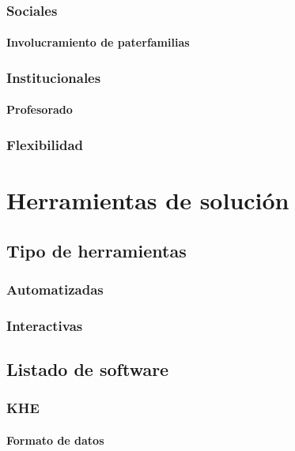 \documentclass[draft,12pt,headsepline,footsepline,paper=letter]{scrreprt}
\begin{document}
\subsection{Sociales}

\subsubsection{Involucramiento de paterfamilias}

\subsection{Institucionales}

\subsubsection{Profesorado}

\subsection{Flexibilidad}

\chapter{Herramientas de solución}

\section{Tipo de herramientas}

\subsection{Automatizadas}

\subsection{Interactivas}

\section{Listado de software}

\subsection{KHE}

\subsubsection{Formato de datos}
\end{document}
